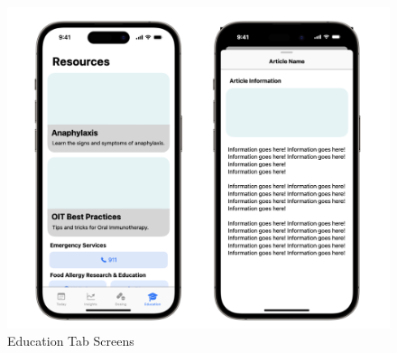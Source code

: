 \begin{figure}[H]
    \centering
    \includegraphics[width=0.7\linewidth]{thesis//chapters//images/education-tab-screens.png}
    \caption{Education Tab Screens}
    \label{fig:education-tab}
\end{figure}

